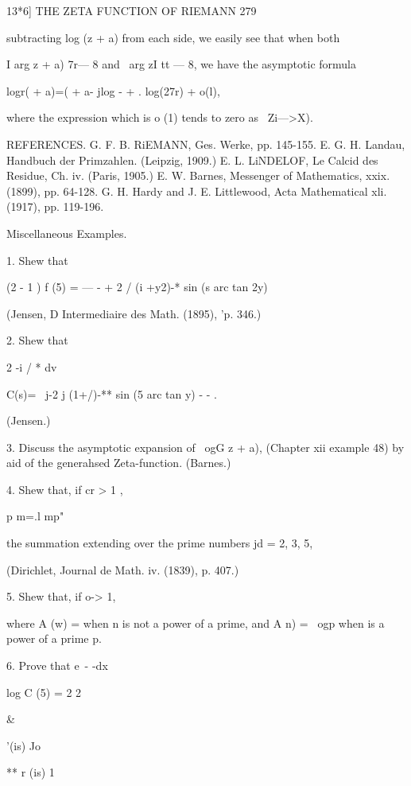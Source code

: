 {{13*6] THE ZETA FUNCTION OF RIEMANN 279

subtracting log (z + a) from each side, we easily see that when both

I arg z + a) 7r— 8 and \ arg zI tt — 8, we have the asymptotic formula

logr( + a)=( + a- jlog - + . log(27r) + o(l),

where the expression which is o (1) tends to zero as \ Zi—>X).

REFERENCES. G. F. B. RiEMANN, Ges. Werke, pp. 145-155. E. G. H.
Landau, Handbuch der Primzahlen. (Leipzig, 1909.) E. L. LiNDELOF, Le
Calcid des Residue, Ch. iv. (Paris, 1905.) E. W. Barnes, Messenger of
Mathematics, xxix. (1899), pp. 64-128. G. H. Hardy and J. E.
Littlewood, Acta Mathematical xli. (1917), pp. 119-196.

Miscellaneous Examples.

1. Shew that



(2 - 1 ) f (5) = — - + 2 / (i +y2)-* sin (s arc tan 2y)



(Jensen, D Intermediaire des Math. (1895), 'p. 346.)

2. Shew that

2 -i / * dv

C(s)= \ j-2 j (1+/)-** sin (5 arc tan y) - - .

(Jensen.)

3. Discuss the asymptotic expansion of \ ogG z + a), (Chapter xii
example 48) by aid of the generahsed Zeta-function. (Barnes.)

4. Shew that, if cr > 1 ,

p m=.l mp"

the summation extending over the prime numbers jd = 2, 3, 5,

(Dirichlet, Journal de Math. iv. (1839), p. 407.)

5. Shew that, if o-> 1,

where A (w) = when n is not a power of a prime, and A n) = \ ogp when
is a power of a prime p.

6. Prove that e~- -dx



log C (5) = 2 2



 \&



'(is) Jo



** r (is) 1



}}
